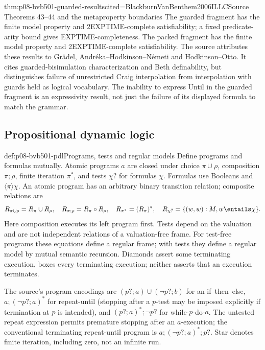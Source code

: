 \begin{hbtheorem}{thm:p08-bvb501-guarded-results}{cited=BlackburnVanBenthem2006ILLC}{Source Theorems 43--44 and the metaproperty boundaries}
The guarded fragment has the finite model property and 2EXPTIME-complete
satisfiability; a fixed predicate-arity bound gives EXPTIME-completeness.
The packed fragment has the finite model property and 2EXPTIME-complete
satisfiability. The source attributes these results to Gr\"adel,
Andr\'eka--Hodkinson--N\'emeti and Hodkinson--Otto.
It cites guarded-bisimulation characterization and Beth definability,
but distinguishes failure of unrestricted Craig interpolation from
interpolation with guards held as logical vocabulary. The inability
to express Until in the guarded fragment is an expressivity result,
not just the failure of its displayed formula to match the grammar.
\end{hbtheorem}

\subsection{Propositional dynamic logic}
\label{sec:p08-bvb501-pdl}

\begin{hbdefinition}{def:p08-bvb501-pdl}{Programs, tests and regular models}
Define programs and formulas mutually. Atomic programs \(a\) are
closed under choice \(\pi\cup\rho\), composition \(\pi;\rho\),
finite iteration \(\pi^*\), and tests \(\chi?\) for formulas
\(\chi\). Formulas use Booleans and \(\langle\pi\rangle\chi\).
An atomic program has an arbitrary binary transition relation; composite
relations are
\[
 R_{\pi\cup\rho}=R_\pi\cup R_\rho,\quad
 R_{\pi;\rho}=R_\pi\circ R_\rho,\quad
 R_{\pi^*}=(R_\pi)^*,\quad
 R_{\chi?}=\{(w,w):M,w\entails\chi\}.
\]
Here composition executes its left program first. Tests depend on the
valuation and are not independent relations of a valuation-free frame.
For test-free programs these equations define a regular frame; with
tests they define a regular model by mutual semantic recursion.
Diamonds assert some terminating execution, boxes every terminating
execution; neither asserts that an execution terminates.
\end{hbdefinition}

The source's program encodings are
\((p?;a)\cup(\neg p?;b)\) for an if--then--else,
\(a;(\neg p?;a)^*\) for repeat-until (stopping after a
\(p\)-test may be imposed explicitly if termination at \(p\)
is intended), and \((p?;a)^*;\neg p?\) for while-\(p\)-do-\(a\).
The untested repeat expression permits premature stopping after an
\(a\)-execution; the conventional terminating repeat-until program
is \(a;(\neg p?;a)^*;p?\). Star denotes finite iteration, including
zero, not an infinite run.

